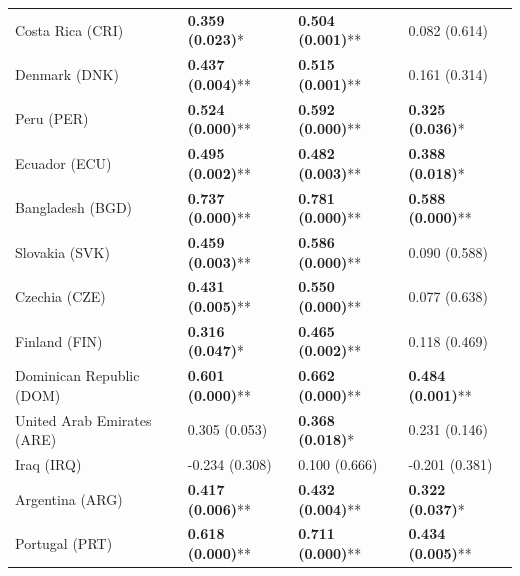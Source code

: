 \begin{longtable}{p{5cm}p{3cm}p{3cm}p{5cm}}
Costa Rica (CRI) & \textcolor{atlLime600}{\textbf{0.359 (0.023)}*} & \textcolor{atlLime600}{\textbf{0.504 (0.001)}**} & \textcolor{atlOrange600}{0.082 (0.614)} \\
Denmark (DNK) & \textcolor{atlLime600}{\textbf{0.437 (0.004)}**} & \textcolor{atlLime600}{\textbf{0.515 (0.001)}**} & \textcolor{atlOrange600}{0.161 (0.314)} \\
Peru (PER) & \textcolor{atlLime600}{\textbf{0.524 (0.000)}**} & \textcolor{atlLime600}{\textbf{0.592 (0.000)}**} & \textcolor{atlLime600}{\textbf{0.325 (0.036)}*} \\
Ecuador (ECU) & \textcolor{atlLime600}{\textbf{0.495 (0.002)}**} & \textcolor{atlLime600}{\textbf{0.482 (0.003)}**} & \textcolor{atlLime600}{\textbf{0.388 (0.018)}*} \\
Bangladesh (BGD) & \textcolor{atlLime600}{\textbf{0.737 (0.000)}**} & \textcolor{atlLime600}{\textbf{0.781 (0.000)}**} & \textcolor{atlLime600}{\textbf{0.588 (0.000)}**} \\
Slovakia (SVK) & \textcolor{atlLime600}{\textbf{0.459 (0.003)}**} & \textcolor{atlLime600}{\textbf{0.586 (0.000)}**} & \textcolor{atlOrange600}{0.090 (0.588)} \\
Czechia (CZE) & \textcolor{atlLime600}{\textbf{0.431 (0.005)}**} & \textcolor{atlLime600}{\textbf{0.550 (0.000)}**} & \textcolor{atlOrange600}{0.077 (0.638)} \\
Finland (FIN) & \textcolor{atlLime600}{\textbf{0.316 (0.047)}*} & \textcolor{atlLime600}{\textbf{0.465 (0.002)}**} & \textcolor{atlOrange600}{0.118 (0.469)} \\
Dominican Republic (DOM) & \textcolor{atlLime600}{\textbf{0.601 (0.000)}**} & \textcolor{atlLime600}{\textbf{0.662 (0.000)}**} & \textcolor{atlLime600}{\textbf{0.484 (0.001)}**} \\
United Arab Emirates (ARE) & \textcolor{atlOrange600}{0.305 (0.053)} & \textcolor{atlLime600}{\textbf{0.368 (0.018)}*} & \textcolor{atlOrange600}{0.231 (0.146)} \\
Iraq (IRQ) & \textcolor{atlOrange600}{-0.234 (0.308)} & \textcolor{atlOrange600}{0.100 (0.666)} & \textcolor{atlOrange600}{-0.201 (0.381)} \\
Argentina (ARG) & \textcolor{atlLime600}{\textbf{0.417 (0.006)}**} & \textcolor{atlLime600}{\textbf{0.432 (0.004)}**} & \textcolor{atlLime600}{\textbf{0.322 (0.037)}*} \\
Portugal (PRT) & \textcolor{atlLime600}{\textbf{0.618 (0.000)}**} & \textcolor{atlLime600}{\textbf{0.711 (0.000)}**} & \textcolor{atlLime600}{\textbf{0.434 (0.005)}**} \\

\end{longtable}
